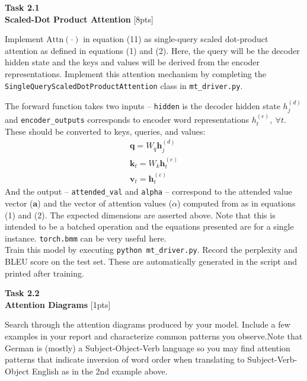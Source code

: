 \documentclass[12pt,article]{article}
\newenvironment{task}[2][Task]
    { \begin{mdframed}[backgroundcolor=gray!20] \textbf{#1 #2} \\}
    {  \end{mdframed}}
\begin{document}
\newpage
\begin{task}{2.1} 
\textbf{Scaled-Dot Product Attention} [8pts]

Implement $\mbox{Attn}(\cdot)$ in equation (11) as single-query scaled dot-product attention as defined in equations (1) and (2). Here, the query will be the decoder hidden state and the keys and values will be derived from the encoder representations. Implement this attention mechanism by completing the \texttt{SingleQueryScaledDotProductAttention} class in \texttt{mt\_driver.py}.

%
\noindent The forward function takes two inputs -- \texttt{hidden} is the decoder hidden state $h_j^{(d)}$ and \texttt{encoder\_outputs} corresponds to encoder word representations $h_t^{(e)},~\forall t$. These should be converted to keys, queries, and values:
\begin{eqnarray}
\mathbf{q} = W_q \mathbf{h}_j^{(d)}\\
\mathbf{k}_t = W_k \mathbf{h}_t^{(e)}\\
\mathbf{v}_t = \mathbf{h}_t^{(e)}
\end{eqnarray}
\noindent And the output -- \texttt{attended\_val} and \texttt{alpha} -- correspond to the attended value vector ($\mathbf{a}$) and the vector of attention values ($\alpha$) computed from as in equations (1) and (2). The expected dimensions are asserted above. Note that this is intended to be a batched operation and the equations presented are for a single instance. \texttt{torch.bmm} can be very useful here.\\[8pt]

\noindent Train this model by executing  \texttt{python mt\_driver.py}. Record the perplexity and BLEU score on the test set. These are automatically generated in the script and printed after training.
\end{task}


\begin{task}{2.2} 
\textbf{Attention Diagrams} [1pts]

Search through the attention diagrams produced by your model. Include a few examples in your report and characterize common patterns you observe.Note that German is (mostly) a Subject-Object-Verb language so you may find attention patterns that indicate inversion of word order when translating to Subject-Verb-Object English as in the 2nd example above.
\end{task}
\end{document}
